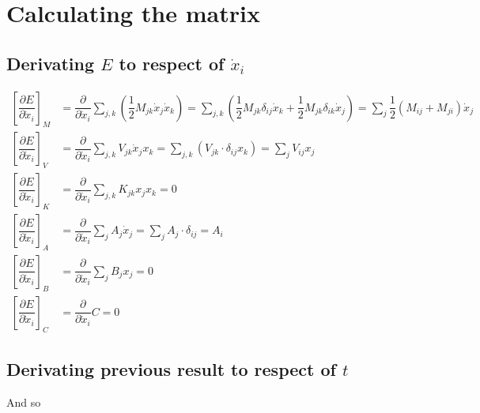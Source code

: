 \documentclass[a4paper]{article}
\begin{document}
\section{Calculating the matrix}

\subsection{Derivating $E$ to respect of $\dot{x}_{i}$}

 
\begin{align*} 
\left[\dfrac{\partial E}{\partial \dot{x}_{i}} \right]_{M} & = \dfrac{\partial}{\partial \dot{x}_{i}}  \sum_{j,k} \left(\dfrac{1}{2} M_{jk} \dot{x}_{j} \dot{x}_{k}  \right)  = \sum_{j, k} \left(\dfrac{1}{2} M_{jk} \delta_{ij} \dot{x}_{k} + \dfrac{1}{2} M_{jk} \delta_{ik} \dot{x}_{j} \right)  = \sum_{j} \dfrac{1}{2}\left(M_{ij} + M_{ji}\right) \dot{x}_{j} \\
\left[\dfrac{\partial E}{\partial \dot{x}_{i}} \right]_{V} & = \dfrac{\partial}{\partial \dot{x}_{i}} \sum_{j, k} V_{jk} \dot{x}_{j} x_{k}  = \sum_{j, k} \left(V_{jk} \cdot \delta_{ij} x_{k} \right) = \sum_{j} V_{ij} x_{j}  \\
\left[\dfrac{\partial E}{\partial \dot{x}_{i}} \right]_{K} & = \dfrac{\partial}{\partial \dot{x}_{i}} \sum_{j, k} K_{jk} x_{j} x_{k} = 0 \\
\left[\dfrac{\partial E}{\partial \dot{x}_{i}} \right]_{A} & = \dfrac{\partial}{\partial \dot{x}_{i}} \sum_{j} A_{j} \dot{x}_{j}  = \sum_{j} A_{j} \cdot \delta_{ij} = A_{i} \\
\left[\dfrac{\partial E}{\partial \dot{x}_{i}} \right]_{B} & = \dfrac{\partial}{\partial \dot{x}_{i}} \sum_{j} B_{j} x_{j} = 0 \\
\left[\dfrac{\partial E}{\partial \dot{x}_{i}} \right]_{C} & = \dfrac{\partial}{\partial \dot{x}_{i}} C = 0 
\end{align*}
 

\subsection{Derivating previous result to respect of $t$}

And so 
 
\end{document}
